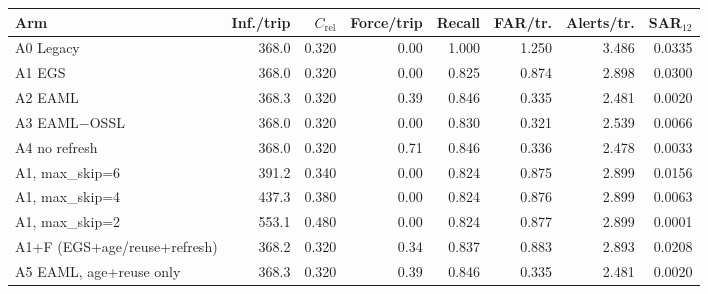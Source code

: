 \begin{tabular}{@{}lrrrrrrr@{}}
\toprule
Arm & Inf./trip & $C_{\mathrm{rel}}$ & Force/trip & Recall & FAR/tr. & Alerts/tr. & SAR$_{12}$\\
\midrule
A0 Legacy & 368.0 & 0.320 & 0.00 & 1.000 & 1.250 & 3.486 & 0.0335\\
A1 EGS & 368.0 & 0.320 & 0.00 & 0.825 & 0.874 & 2.898 & 0.0300\\
A2 EAML & 368.3 & 0.320 & 0.39 & 0.846 & 0.335 & 2.481 & 0.0020\\
A3 EAML$-$OSSL & 368.0 & 0.320 & 0.00 & 0.830 & 0.321 & 2.539 & 0.0066\\
A4 no refresh & 368.0 & 0.320 & 0.71 & 0.846 & 0.336 & 2.478 & 0.0033\\
A1, max\_skip=6 & 391.2 & 0.340 & 0.00 & 0.824 & 0.875 & 2.899 & 0.0156\\
A1, max\_skip=4 & 437.3 & 0.380 & 0.00 & 0.824 & 0.876 & 2.899 & 0.0063\\
A1, max\_skip=2 & 553.1 & 0.480 & 0.00 & 0.824 & 0.877 & 2.899 & 0.0001\\
A1+F (EGS+age/reuse+refresh) & 368.2 & 0.320 & 0.34 & 0.837 & 0.883 & 2.893 & 0.0208\\
A5 EAML, age+reuse only & 368.3 & 0.320 & 0.39 & 0.846 & 0.335 & 2.481 & 0.0020\\
\bottomrule
\end{tabular}